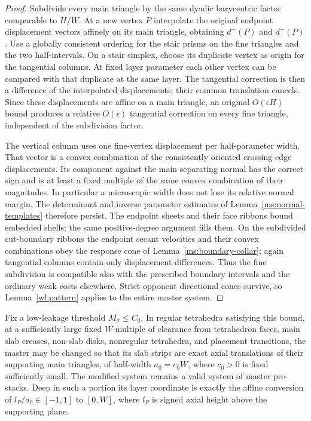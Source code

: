 \begin{proof}
Subdivide every main triangle by the same dyadic barycentric
factor comparable to $H/W$.  At a new vertex $P$ interpolate the
original endpoint displacement vectors affinely on its main
triangle, obtaining $d^-(P)$ and $d^+(P)$.  Use a globally
consistent ordering for the stair prisms on the fine triangles
and the two half-intervals.  On a stair simplex, choose its
duplicate vertex as origin for the tangential columns.  At fixed
layer parameter each other vertex can be compared with that
duplicate at the same layer.  The tangential correction is then
a difference of the interpolated displacements; their common
translation cancels.  Since these displacements are affine on a
main triangle, an original $O(\epsilon H)$ bound produces a
relative $O(\epsilon)$ tangential correction on every fine
triangle, independent of the subdivision factor.

The vertical column uses one fine-vertex displacement per
half-parameter width.  That vector is a convex combination of
the consistently oriented crossing-edge displacements.  Its
component against the main separating normal has the correct
sign and is at least a fixed multiple of the same convex
combination of their magnitudes.  In particular a microscopic
width does not lose its relative normal margin.  The determinant
and inverse parameter estimates of Lemma~\ref{ms:normal-templates}
therefore persist.  The endpoint sheets and their face ribbons
bound embedded shells; the same positive-degree argument fills
them.  On the subdivided cut-boundary ribbons the endpoint
secant velocities and their convex combinations obey the
response cone of Lemma~\ref{ms:boundary-collar}; again tangential
columns contain only displacement differences.  Thus the fine
subdivision is compatible also with the prescribed boundary
intervals and the ordinary weak costs elsewhere.  Strict
opponent directional cones survive, so Lemma~\ref{wl:pattern} applies
to the entire master system.
\end{proof}

\begin{lemma}
\label{ms:translations}
Fix a low-leakage threshold $M_\sigma\le C_0$.  In regular
tetrahedra satisfying this bound, at a sufficiently large fixed
$W$-multiple of
clearance from tetrahedron faces, main slab creases, non-slab
disks, nonregular tetrahedra, and placement transitions, the master
may be changed so that its slab strips are exact axial
translations of their supporting main triangles, of half-width
$a_0=c_0W$, where $c_0>0$ is fixed sufficiently small.  The
modified system remains a valid system of master pre-stacks.  Deep in such
a portion its layer coordinate is exactly the affine conversion
of $l_P/a_0\in[-1,1]$ to $[0,W]$, where $l_P$ is signed axial
height above the supporting plane.
\end{lemma}

